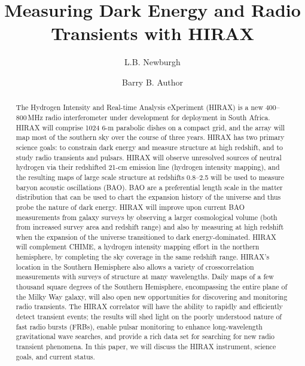 \documentclass[]{spie}  %
\title{Measuring Dark Energy and Radio Transients with HIRAX}
\author[a]{L.B. Newburgh}
\author[b]{Barry B. Author}
\affil[a]{Dunlap Institute, University of Toronto, 50 St. George St., Toronto, Canada}
\affil[b]{Affiliation2, Address, City, Country}
\begin{document}
 
\maketitle

\begin{abstract}
The Hydrogen Intensity and Real-time Analysis eXperiment (HIRAX) is a new 400--800\,MHz radio interferometer under development for deployment in South Africa. HIRAX will comprise 1024 6-m parabolic dishes on a compact grid, and the array will map most of the southern sky over the course of three years. HIRAX has two primary science goals: to constrain dark energy and measure structure at high redshift, and to study radio transients and pulsars. HIRAX will observe unresolved sources of neutral hydrogen via their redshifted 21-cm emission line (hydrogen intensity mapping), and the resulting maps of large scale structure at redshifts 0.8--2.5 will be used to measure baryon acoustic oscillations (BAO). BAO are a preferential length scale in the matter distribution that can be used to chart the expansion history of the universe and thus probe the nature of dark energy. HIRAX will improve upon current BAO measurements from galaxy surveys by observing a larger cosmological volume (both from increased survey area and redshift range) and also by measuring at high redshift when the expansion of the universe transitioned to dark energy-dominated. HIRAX will complement CHIME, a hydrogen intensity mapping effort in the northern hemisphere, by completing the sky coverage in the same redshift range. HIRAX's location in the Southern Hemisphere also allows a variety of crosscorrelation measurements with surveys of structure at many wavelengths. Daily maps of a few thousand square degrees of the Southern Hemisphere, encompassing the entire plane of the Milky Way galaxy, will also open new opportunities for discovering and monitoring radio transients. The HIRAX correlator will have the ability to rapidly and efficiently detect transient events; the results will shed light on the poorly understood nature of fast radio bursts (FRBs), enable pulsar monitoring to enhance long-wavelength gravitational wave searches, and provide a rich data set for searching for new radio transient phenomena. In this paper, we will discuss the HIRAX instrument, science goals, and current status.
\end{abstract}

\end{document}
